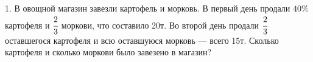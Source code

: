 1. В овощной магазин завезли картофель и морковь. В первый день продали $40\%$ картофеля и $\cfrac{2}{3}$ моркови, что составило 20т. Во второй день продали $\cfrac{2}{3}$ оставшегося картофеля и всю оставшуюся морковь --- всего 15т. Сколько картофеля и сколько моркови было завезено в магазин?\\
